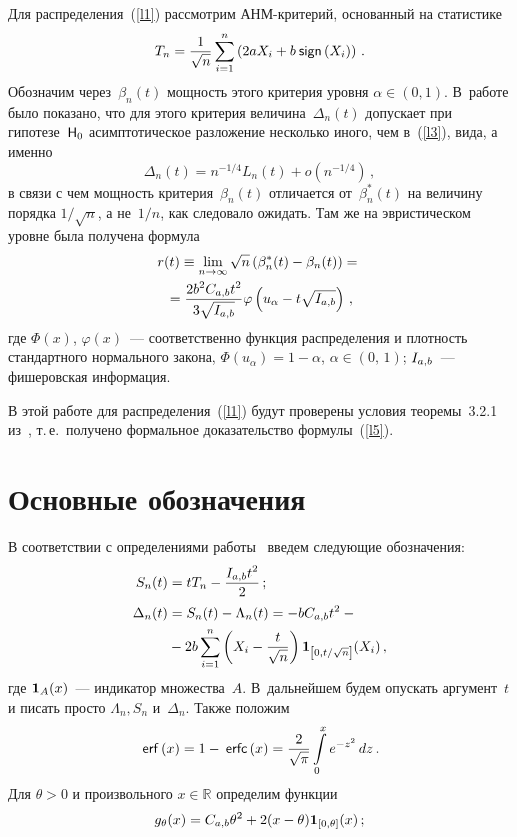 \begin{multicols}{2}
Для распределения~(\ref{l1}) рассмотрим АНМ-кри\-те\-рий, основанный на статистике
\begin{equation*}
T_n = \displaystyle\frac{\displaystyle 1\mathstrut}{\displaystyle \sqrt{n}\mathstrut} \sum_{i = 1}^n\left(2aX_i + b\:{\sf sign}\left(X_i\right)\right)\,.
\end{equation*}
Обозначим через~$\beta_n(t)$ мощность этого критерия уровня $\alpha \in (0,1)$. 
В~работе \cite{article} было показано, что для этого критерия величина~$\Delta_n(t)$ допускает при 
гипотезе~${\sf H}_0$ асимптотическое разложение несколько иного, чем в~(\ref{l3}), вида, а именно
$$
\Delta_n(t) = n^{-1/4} L_n(t) +  o (n^{-1/4})\,,
$$
в связи с чем мощность критерия~$\beta_n(t)$ отличается от~$\beta_n^*(t)$ на величину порядка $1/\sqrt{n}$, 
а не~$1/n$, как следовало ожидать. Там же на эвристическом уровне была получена формула
\begin{multline}
r(t) \equiv \lim_{n \to \infty} \sqrt{n}\left(\beta_n^*(t) - \beta_n(t)\right) = {}\\
{}=
\displaystyle\frac{\displaystyle 2b^2C_{a,b} t^2\mathstrut}{\displaystyle 3\sqrt{I_{a,b}}\mathstrut} \varphi\left(u_{\alpha} - t\sqrt{I_{a,b}}\right)\,,
\label{l5}
\end{multline}
где $\Phi(x)$, $\varphi(x)$~--- соответственно функция распределения и плотность стандартного нормального закона, 
$\Phi(u_{\alpha}) = 1 - \alpha$, $\alpha \in (0,\,1)$; $I_{a,b}$~--- фишеровская информация.

В этой работе для распределения~(\ref{l1}) будут проверены условия теоремы~3.2.1 из~\cite{bening}, т.\,е.\ 
получено формальное доказательство формулы~(\ref{l5}).

\section{Основные обозначения}

В соответствии с определениями работы~\cite{article} введем следующие обозначения:
\begin{align}
S_n(t) &= tT_n - \displaystyle\frac{\displaystyle I_{a,b} t^2\mathstrut}{\displaystyle 2\mathstrut}\,;\notag\\
\Delta_n(t) &= S_n(t) - \Lambda_n(t) = -bC_{a,b} t^2 -{}\notag\\
&{}-2b\sum\limits_{i=1}^n\left(X_i-\displaystyle\frac{\displaystyle t\mathstrut}{\displaystyle \sqrt{n}\mathstrut}\right)
{{\bf 1}}_{\left[0,t/\sqrt{n}\right]}(X_i)\,,
\label{l7}
\end{align}
где ${{\bf 1}}_A(x)$~--- индикатор множества~$A$. В~дальнейшем будем опускать аргумент~$t$ 
и писать просто $\Lambda_n, S_n$ и~$\Delta_n$. Также положим
$$
\:{\sf erf}\left(x\right) = 1 - \:{\sf erfc}\left(x\right) = \displaystyle\frac{\displaystyle 2\mathstrut}{\displaystyle \sqrt{\pi}\mathstrut} \int\limits_0^x e^{-z^2}\,dz\,.
$$
Для $\theta > 0$ и произвольного $x \in {\mathbb{R}}$ определим функции
\begin{equation}
g_{\theta}(x) = C_{a,b} \theta^2 + 2(x-\theta){{\bf 1}}_{[0,\theta]}(x)\,;
\label{l8}
\end{equation}
\vspace*{-6pt}


\end{multicols}
